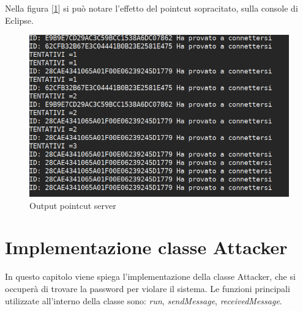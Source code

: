 \documentclass[a4paper,12pt,titlepage,oneside,openany]{book}
\begin{document}
\newpage
Nella figura [\ref{fig:jconsoleserver}] si può notare l'effetto del pointcut sopracitato, sulla console di Eclipse.
\begin{figure}[H]
	\centering
	\includegraphics[scale=0.6]{jconsoleserver.png}
	\caption{Output pointcut server}
	\label{fig:jconsoleserver}
\end{figure}


\chapter{Implementazione classe Attacker}
In questo capitolo viene spiega l'implementazione della classe Attacker, che si occuperà di trovare la password per violare il sistema. Le funzioni principali utilizzate all'interno della classe sono: \textit{run}, \textit{sendMessage}, \textit{receivedMessage}.
\end{document}
